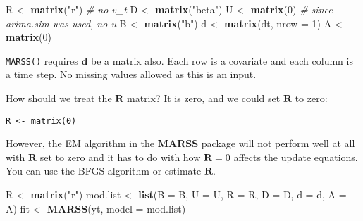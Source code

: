 \documentclass[12pt,]{book}
\newenvironment{Shaded}{\begin{snugshade}}{\end{snugshade}}
\newcommand{\CommentTok}[1]{\textcolor[rgb]{0.56,0.35,0.01}{\textit{#1}}}
\newcommand{\DataTypeTok}[1]{\textcolor[rgb]{0.13,0.29,0.53}{#1}}
\newcommand{\DecValTok}[1]{\textcolor[rgb]{0.00,0.00,0.81}{#1}}
\newcommand{\KeywordTok}[1]{\textcolor[rgb]{0.13,0.29,0.53}{\textbf{#1}}}
\newcommand{\NormalTok}[1]{#1}
\newcommand{\StringTok}[1]{\textcolor[rgb]{0.31,0.60,0.02}{#1}}
\begin{document}
\begin{Shaded}
\begin{Highlighting}[]
\NormalTok{R <-}\StringTok{ }\KeywordTok{matrix}\NormalTok{(}\StringTok{"r"}\NormalTok{)  }\CommentTok{# no v_t}
\NormalTok{D <-}\StringTok{ }\KeywordTok{matrix}\NormalTok{(}\StringTok{"beta"}\NormalTok{)}
\NormalTok{U <-}\StringTok{ }\KeywordTok{matrix}\NormalTok{(}\DecValTok{0}\NormalTok{)  }\CommentTok{# since arima.sim was used, no u}
\NormalTok{B <-}\StringTok{ }\KeywordTok{matrix}\NormalTok{(}\StringTok{"b"}\NormalTok{)}
\NormalTok{d <-}\StringTok{ }\KeywordTok{matrix}\NormalTok{(dt, }\DataTypeTok{nrow =} \DecValTok{1}\NormalTok{)}
\NormalTok{A <-}\StringTok{ }\KeywordTok{matrix}\NormalTok{(}\DecValTok{0}\NormalTok{)}
\end{Highlighting}
\end{Shaded}

\texttt{MARSS()} requires \(\mathbf{d}\) be a matrix also. Each row is a covariate and each column is a time step. No missing values allowed as this is an input.

How should we treat the \(\mathbf{R}\) matrix? It is zero, and we could set \(\mathbf{R}\) to zero:

\begin{verbatim}
R <- matrix(0)
\end{verbatim}

However, the EM algorithm in the \textbf{MARSS} package will not perform well at all with \(\mathbf{R}\) set to zero and it has to do with how \(\mathbf{R}=0\) affects the update equations. You can use the BFGS algorithm or estimate \(\mathbf{R}\).

\begin{Shaded}
\begin{Highlighting}[]
\NormalTok{R <-}\StringTok{ }\KeywordTok{matrix}\NormalTok{(}\StringTok{"r"}\NormalTok{)}
\NormalTok{mod.list <-}\StringTok{ }\KeywordTok{list}\NormalTok{(}\DataTypeTok{B =}\NormalTok{ B, }\DataTypeTok{U =}\NormalTok{ U, }\DataTypeTok{R =}\NormalTok{ R, }\DataTypeTok{D =}\NormalTok{ D, }\DataTypeTok{d =}\NormalTok{ d, }\DataTypeTok{A =}\NormalTok{ A)}
\NormalTok{fit <-}\StringTok{ }\KeywordTok{MARSS}\NormalTok{(yt, }\DataTypeTok{model =}\NormalTok{ mod.list)}
\end{Highlighting}
\end{Shaded}
\end{document}
